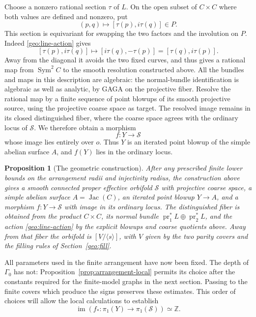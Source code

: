 \documentclass[11pt,reqno]{amsart}
\numberwithin{equation}{section}
\newtheorem{proposition}[theorem]{Proposition}
\theoremstyle{definition}
\theoremstyle{remark}
\begin{document}
Choose a nonzero rational section $\tau$ of $L$.  On the open subset
of $C\times C$ where both values are defined and nonzero, put
\begin{equation}\label{geo:rational-section}
                 (p,q)\longmapsto[\tau(p),i\tau(q)]\in P.
\end{equation}
This section is equivariant for swapping the two factors and the
involution on $P$.  Indeed \eqref{geo:line-action} gives
\[
       [\tau(p),i\tau(q)]\longmapsto[i\tau(q),-\tau(p)]
                            =[\tau(q),i\tau(p)].
\]
Away from the diagonal it avoids the two fixed curves, and thus gives
a rational map from $\operatorname{Sym}^2C$ to the smooth resolution constructed
above.  All the bundles and maps in this description are algebraic:
the normal-bundle identification is algebraic as well as analytic,
by GAGA on the projective fiber.  Resolve the rational map by a finite
sequence of point blowups of its smooth projective source, using the
projective coarse space as target.  The resolved image remains in its
closed distinguished fiber, where the coarse space agrees with the
ordinary locus of $\mathcal S$.  We therefore obtain a morphism
\begin{equation}\label{geo:Ymap}
                        f:Y\longrightarrow\mathcal S
\end{equation}
whose image lies entirely over $o$.  Thus $Y$ is an iterated point
blowup of the simple abelian surface $A$, and $f(Y)$ lies in the
ordinary locus.

\begin{proposition}[The geometric construction]\label{prop:orbifold-surface}
After any prescribed finite lower bounds on the arrangement radii and
injectivity radius, the construction above gives a smooth connected
proper effective orbifold $\mathcal S$ with projective coarse space, a simple
abelian surface $A=\operatorname{Jac}(C)$, an iterated point blowup $Y\to A$, and a
morphism $f:Y\to\mathcal S$ with image in its ordinary locus.  The distinguished
fiber is obtained from the product $C\times C$, its normal bundle
$\operatorname{pr}_1^*L\oplus\operatorname{pr}_2^*L$, and the action
\eqref{geo:line-action} by the explicit blowups and coarse quotients
above.  Away from that fiber the orbifold is $[V/\langle s\rangle]$,
with $V$ given by the two parity covers and the filling rules of
Section~\ref{geo:fill}.
\end{proposition}

All parameters used in the finite arrangement have now been fixed.
The depth of $\Gamma_0$ has not: Proposition~\ref{prop:arrangement-local}
permits its choice after the constants required for the finite-model
graphs in the next section.  Passing to the finite covers which produce
the signs preserves these estimates.  This order of choices will
allow the local calculations to establish
\[
                    \operatorname{im}(f_*:\pi_1(Y)\to\pi_1(\mathcal S))\simeq\mathbb Z.
\]
\end{document}
